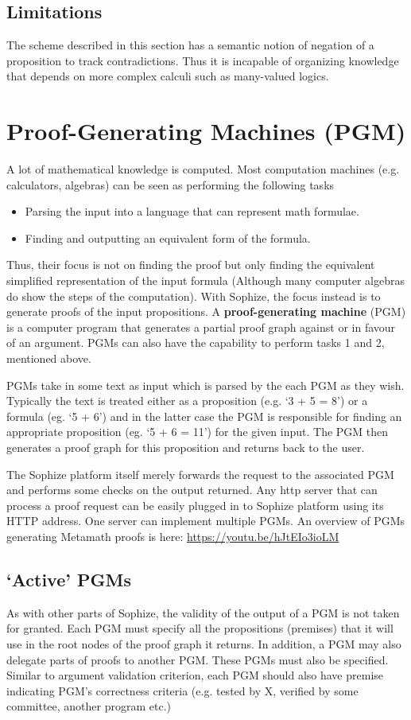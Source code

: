 \documentclass[runningheads]{llncs}
\begin{document}
\subsection{Limitations}
The scheme described in this section has a semantic notion of negation of a proposition to track contradictions. Thus it is incapable of organizing knowledge that depends on more complex calculi such as many-valued logics.

\section{Proof-Generating Machines (PGM)}
\label{sec:pgm}
A lot of mathematical knowledge is computed. Most computation machines (e.g. calculators, algebras) can be seen as performing the following tasks
\begin{itemize}
\item Parsing the input into a language that can represent math formulae. 
\item Finding and outputting an equivalent form of the formula.
\end{itemize}
Thus, their focus is not on finding the proof but only finding the equivalent simplified representation of the input formula (Although many computer algebras do show the steps of the computation). With Sophize, the focus instead is to generate proofs of the input propositions. A \textbf{proof-generating machine} (PGM) is a computer program that generates a partial proof graph against or in favour of an argument. PGMs can also have the capability to perform tasks 1 and 2, mentioned above.

PGMs take in some text as input which is parsed by the each PGM as they wish. Typically the text is treated either as a proposition (e.g. `3 + 5 = 8') or a formula (eg. `5 + 6') and in the latter case the PGM is responsible for finding an appropriate proposition (eg. `5 + 6 = 11') for the given input. The PGM then generates a proof graph for this proposition and returns back to the user.

The Sophize platform itself merely forwards the request to the associated PGM and performs some checks on the output returned. Any http server that can process a proof request can be easily plugged in to Sophize platform using its HTTP address. One server can implement multiple PGMs. An overview of PGMs generating Metamath proofs is here: \url{https://youtu.be/hJtEIo3ioLM}

\subsection{`Active' PGMs}
As with other parts of Sophize, the validity of the output of a PGM is not taken for granted. Each PGM must specify all the propositions (premises) that it will use in the root nodes of the proof graph it returns. In addition, a PGM may also delegate parts of proofs to another PGM. These PGMs must also be specified. Similar to argument validation criterion, each PGM should also have premise indicating PGM's correctness criteria (e.g. tested by X, verified by some committee, another program etc.)
\end{document}
